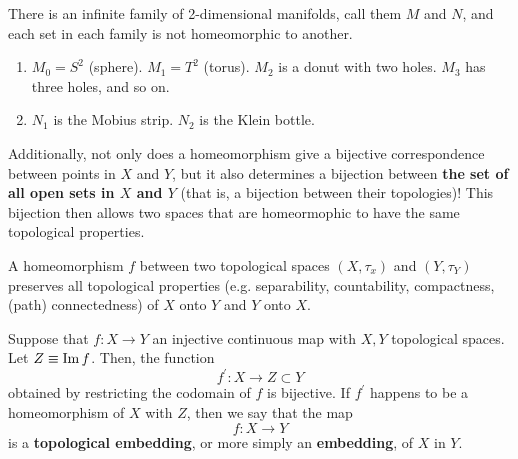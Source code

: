   \begin{example}
    There is an infinite family of 2-dimensional manifolds, call them $M$ and $N$, and each set in each family is not homeomorphic to another.  
    \begin{enumerate}
      \item $M_0 = S^2$ (sphere). $M_1 = T^2$ (torus). $M_2$ is a donut with two holes. $M_3$ has three holes, and so on. 
      \item $N_1$ is the Mobius strip. $N_2$ is the Klein bottle. 
    \end{enumerate}
  \end{example}

  Additionally, not only does a homeomorphism give a bijective correspondence between points in $X$ and $Y$, but it also determines a bijection between \textbf{the set of all open sets in $X$ and $Y$} (that is, a bijection between their topologies)! This bijection then allows two spaces that are homeormophic to have the same topological properties. 

  \begin{theorem}
    A homeomorphism $f$ between two topological spaces $(X, \tau_{x})$ and $(Y, \tau_{Y})$ preserves all topological properties (e.g. separability, countability, compactness, (path) connectedness) of $X$ onto $Y$ and $Y$ onto $X$. 
  \end{theorem}

  \begin{definition}[Embedding]
    Suppose that $f: X \longrightarrow Y$ an injective continuous map with $X, Y$ topological spaces. Let $Z \equiv \im{f}$. Then, the function
    \begin{equation}
      f^\prime: X \longrightarrow Z \subset Y
    \end{equation}
    obtained by restricting the codomain of $f$ is bijective. If $f^\prime$ happens to be a homeomorphism of $X$ with $Z$, then we say that the map
    \begin{equation}
      f: X \longrightarrow Y
    \end{equation}
    is a \textbf{topological embedding}, or more simply an \textbf{embedding}, of $X$ in $Y$. 
  \end{definition}


